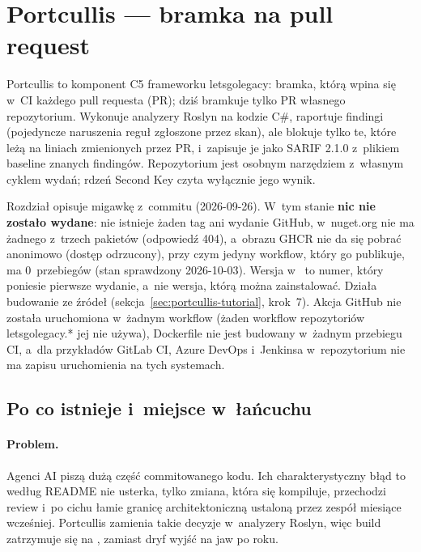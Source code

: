 \section{Portcullis --- bramka na pull request}\label{sec:portcullis}

Portcullis to komponent C5 frameworku letsgolegacy: bramka, którą wpina się w~CI każdego
pull requesta (PR); dziś bramkuje tylko PR własnego repozytorium. Wykonuje analyzery
Roslyn na kodzie C\#, raportuje findingi (pojedyncze
naruszenia reguł zgłoszone przez skan), ale blokuje tylko te, które leżą na liniach
zmienionych przez PR, i~zapisuje je jako SARIF 2.1.0 z~plikiem baseline znanych
findingów. Repozytorium  jest osobnym narzędziem
z~własnym cyklem wydań; rdzeń Second Key czyta wyłącznie jego wynik.

Rozdział opisuje migawkę z~commitu  (2026-09-26). W~tym stanie
\textbf{nic nie zostało wydane}: nie istnieje żaden tag  ani wydanie GitHub,
w~nuget.org nie ma żadnego z~trzech pakietów (odpowiedź 404), a~obrazu GHCR nie da się
pobrać anonimowo (dostęp odrzucony), przy czym jedyny workflow, który go publikuje, ma
0~przebiegów (stan sprawdzony 2026-10-03). Wersja 
w~ to numer, który poniesie pierwsze wydanie, a~nie wersja,
którą można zainstalować. Działa budowanie ze źródeł (sekcja~\ref{sec:portcullis-tutorial},
krok~7). Akcja GitHub nie została uruchomiona w~żadnym workflow (żaden workflow
repozytoriów letsgolegacy.* jej nie używa), Dockerfile nie jest budowany w~żadnym przebiegu CI,
a~dla przykładów GitLab CI, Azure DevOps i~Jenkinsa w~repozytorium nie ma zapisu uruchomienia
na tych systemach.

\subsection{Po co istnieje i~miejsce w~łańcuchu}\label{sec:portcullis-cel}

\paragraph{Problem.} Agenci AI piszą dużą część commitowanego kodu. Ich charakterystyczny
błąd to według README nie usterka, tylko zmiana, która się kompiluje, przechodzi review
i~po cichu łamie granicę architektoniczną ustaloną przez zespół miesiące wcześniej.
Portcullis zamienia takie decyzje w~analyzery Roslyn, więc build zatrzymuje się na
, zamiast dryf wyjść na jaw po roku.

